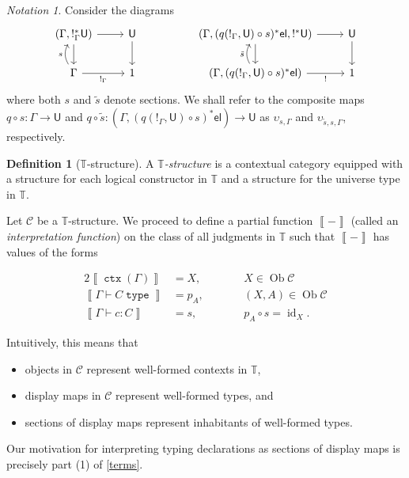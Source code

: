 \documentclass[10pt,letterpaper,cm]{nupset}
\theoremstyle{definition}
\newtheorem{definition}{Definition}[subsection]
\theoremstyle{theorem}
\theoremstyle{remark}
\newtheorem*{notation}{Notation}
\DeclareMathOperator{\ob}{Ob}
\newcommand{\U}{\mathsf{U}}
\newcommand{\el}{\mathsf{el}}
\newcommand{\0}{\mathbf{0}}
\newcommand{\1}{\mathbf{1}}
\newcommand{\2}{\mathbf{2}}
\DeclareMathOperator{\ctx}{\mathtt{ctx}}
\DeclareMathOperator{\type}{\mathtt{type}}
\renewcommand{\c}{\mathscr{C}}
\newcommand{\T}{\mathbb T}
\DeclareMathOperator{\idd}{id}
\newcommand{\bi}{\begin{itemize}}
\newcommand{\ei}{\end{itemize}}
\begin{document}
\begin{notation} 
Consider the diagrams
\[
\begin{tikzcd}
{\left(\Gamma, !_\Gamma^{\ast}{\U}\right)} \arrow[r] \arrow[d] & \U \arrow[d] &  & {\left(\Gamma, (q(!_\Gamma, \U)\circ s)^{\ast}{\el}, !^{\ast}{\U}\right)} \arrow[d] \arrow[r]                  & \U \arrow[d] \\
\Gamma \arrow[r, "!_\Gamma"'] \arrow[u, "s", bend left]       & 1            &  & {\left(\Gamma, (q(!_\Gamma, \U)\circ s)^{\ast}{\el}\right)} \arrow[r, "!"'] \arrow[u, "\tilde{s}", bend left] & 1          
\end{tikzcd}
\] where both $s$ and $\tilde{s}$ denote sections. We shall refer to the composite maps $q\circ s : \Gamma \to \U$ and $q\circ \tilde{s} : \left(\Gamma, (q(!_\Gamma, \U)\circ s)^{\ast}{\el}\right) \to \U$ as $\upsilon_{s, \Gamma}$ and $\upsilon_{\tilde{s}, s, \Gamma}$, respectively. 
\end{notation}

\begin{definition}[$\T$-structure]\label{model1}
A \textit{$\T$-structure} is a contextual category equipped with a structure for each logical constructor in $\T$ and a structure for the universe type in $\T$.
\end{definition}

Let $\c$ be a $\T$-structure. We proceed to define a partial function $\left\llbracket{-}\right\rrbracket$ (called an \textit{interpretation function}) on the class of all judgments in $\T$\label{intfunct} such that  $\left\llbracket{-}\right\rrbracket$  has values of the forms

\begin{alignat*}{2}
\left\llbracket{\ctx(\Gamma)}\right\rrbracket & = X, \qquad && X\in \ob{\c}
\\  \left\llbracket{\Gamma \vdash C \type}\right\rrbracket & = p_{A}, \qquad && \left(X, A\right) \in \ob{\c}
\\ \left\llbracket{\Gamma \vdash c :C}\right\rrbracket  & =  s, \qquad && p_A \circ s = \idd_X.
\end{alignat*}

Intuitively, this means that 
\bi
\item objects in $\c$ represent well-formed contexts in $\T$,
\item display maps in $\c$ represent well-formed types, and
\item sections of display maps represent inhabitants of well-formed types.
\ei  Our motivation for interpreting typing declarations as sections of display maps is precisely part (1) of \cref{terms}. 
\end{document}
